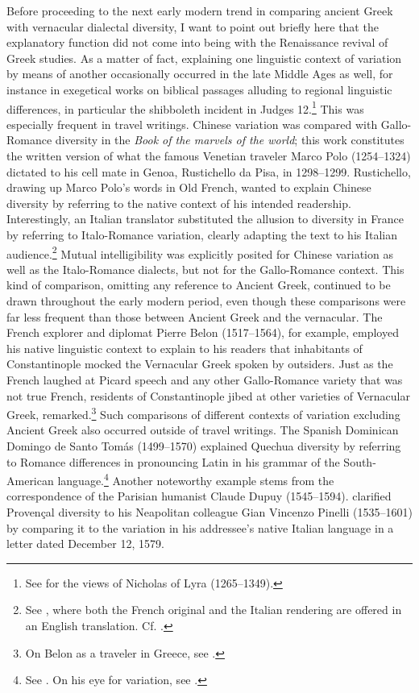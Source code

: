 Before proceeding to the next early modern trend in comparing ancient Greek with vernacular dialectal diversity, I want to point out briefly here that the explanatory function did not come into being with the Renaissance revival of Greek studies. As a matter of fact, explaining one linguistic context of variation by means of another occasionally occurred in the late Middle Ages as well, for instance in exegetical works on biblical passages alluding to regional linguistic differences, in particular the shibboleth incident in Judges 12.\footnote{See \citet[199--200]{VanRooy2018b} for the views of Nicholas of Lyra (1265–1349).} This was especially frequent in travel writings. Chinese variation was compared with Gallo-Romance diversity in the \textit{Book of the marvels of the world}; this work constitutes the written version of what the famous Venetian traveler Marco Polo (1254–1324) dictated to his cell mate in Genoa, Rustichello da Pisa, in 1298–1299. Rustichello, drawing up Marco Polo’s words in Old French, wanted to explain Chinese diversity by referring to the native context of his intended readership. Interestingly, an Italian translator substituted the allusion to diversity in France by referring to Italo-Romance variation, clearly adapting the text to his Italian audience.\footnote{See \citet[157]{Polo1938}, where both the French original and the Italian rendering are offered in an English translation. Cf. \citet[855]{Borst1957}.} Mutual intelligibility was explicitly posited for Chinese variation as well as the Italo-Romance dialects, but not for the Gallo-Romance context. This kind of comparison, omitting any reference to Ancient Greek, continued to be drawn throughout the early modern period, even though these comparisons were far less frequent than those between Ancient Greek and the vernacular. The French explorer and diplomat Pierre Belon (1517–1564), for example, employed his native linguistic context to explain to his readers that inhabitants of Constantinople mocked the Vernacular Greek spoken by outsiders. Just as the French laughed at Picard speech and any other Gallo-Romance variety that was not true French, residents of Constantinople jibed at other varieties of Vernacular Greek, \citet[5\textsc{\textsuperscript{v}}]{Belon1553} remarked.\footnote{On Belon as a traveler in Greece, see \citet[esp. 122]{Vingopoulou2004}.} Such comparisons of different contexts of variation excluding Ancient Greek also occurred outside of travel writings. The Spanish Dominican Domingo de Santo Tomás (1499–1570) explained Quechua diversity by referring to Romance differences in pronouncing Latin in his grammar of the South-American language.\footnote{See \citet[1\textsc{\textsuperscript{v}}]{Santo1560}. On his eye for variation, see \citet[140]{Calvo2005}.} Another noteworthy example stems from the correspondence of the Parisian humanist Claude Dupuy (1545–1594). \citet[274]{Dupuy2001} clarified Provençal diversity to his Neapolitan colleague Gian Vincenzo Pinelli (1535–1601) by comparing it to the variation in his addressee’s native Italian language in a letter dated December 12, 1579.

